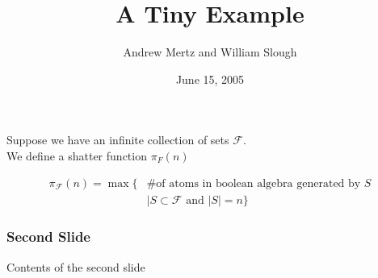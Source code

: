 \documentclass{beamer}
\title{A Tiny Example}
\author{Andrew Mertz and William Slough}
\date{June 15, 2005}
\newcommand{\F}{\mathcal F}
\begin{document}
\maketitle

\begin{frame}
	Suppose we have an infinite collection of sets $\F$. \\
	We define a shatter function $\pi_F(n)$

	\begin{align*}
		\pi_\F(n) = \max \{ &\text {\# of atoms in boolean algebra generated by $S$} \\
		            &\mid S \subset \F \text{ and } |S| = n\}
	\end{align*}
\end{frame}

\begin{frame}
	\frametitle{Second Slide}
	Contents of the second slide
\end{frame}
\end{document}
